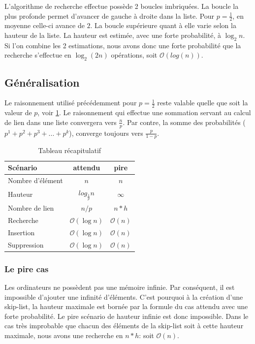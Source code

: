\documentclass[hidelinks,a4paper, 12pt]{article}
\begin{document}
	L'algorithme de recherche effectue possède 2 boucles imbriquées. La boucle la plus profonde permet d'avancer de gauche à droite dans la liste. Pour $p=\frac{1}{2}$, en moyenne celle-ci avance de $2$. La boucle supérieure quant à elle varie selon la hauteur de la liste. La hauteur est estimée, avec une forte probabilité, à $\log_{2} n $. Si l'on combine les 2 estimations, nous avons donc une forte probabilité que la recherche s'effectue en $\log_{2}( 2n )$ opérations, soit $\mathcal{O}(log(n))$.
	
	
	\subsection{Généralisation}
	
	Le raisonnement utilisé précédemment pour $p=\frac{1}{2}$ reste valable quelle que soit la valeur de $p$, voir \cref{recap}. Le raisonnement qui effectue une sommation servant au calcul de lien dans une liste convergera vers $\frac{n}{p}$. Par contre, la somme des probabilités ($p^1 + p^2 + p^3 + ... + p^k$), converge toujours vers $\frac{p}{1-p}$. 
	 	
	 \begin{table}[h]
	 \begin{tabular}{|l|c|c|}
	 	\hline
	 	Scénario & attendu & pire \\
	 	\hline
	 	Nombre d'élément & $n$ & $n$ \\ 
	 	\hline
	 	Hauteur & $log_{\frac{1}{p}} n$ & $\infty$ \\ 
	 	\hline
	 	Nombre de lien & $n/p$ & $n*h$ \\ 
	 	\hline
	 	Recherche & $\mathcal{O}(\log n)$ & $\mathcal{O}(n)$ \\ 
	 	\hline
	 	Insertion & $\mathcal{O}(\log n)$ & $\mathcal{O}(n)$ \\
	 	\hline
	 	Suppression & $\mathcal{O}(\log n)$ & $\mathcal{O}(n)$\\
	 	\hline
	 \end{tabular}
	 \caption{Tableau récapitulatif}
	 \label{recap}
	 \end{table}
	 
	 \subsubsection*{Le pire cas}
	 	
	 Les ordinateurs ne possèdent pas une mémoire infinie. Par conséquent, il est impossible d'ajouter une infinité d'éléments. C'est pourquoi à la création d'une skip-list, la hauteur maximale est bornée par la formule du cas attendu avec une forte probabilité. Le pire scénario de hauteur infinie est donc impossible. Dans le cas très improbable que chacun des éléments de la skip-list soit à cette hauteur maximale, nous avons une recherche en $n*h$: soit $\mathcal{O}(n)$. 
	 	
\end{document}
